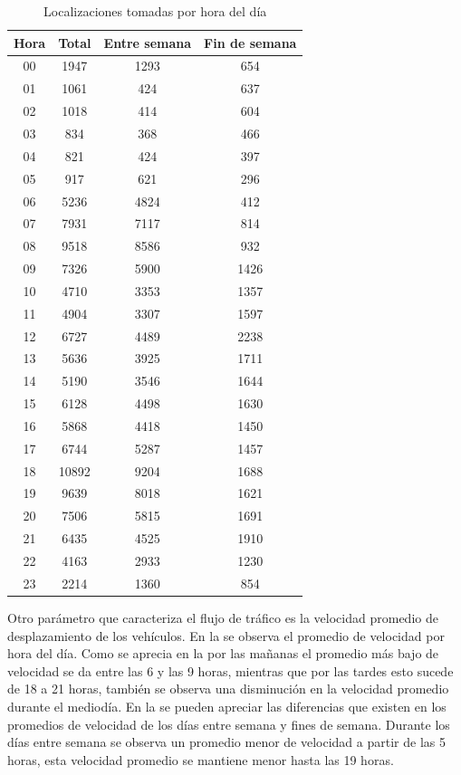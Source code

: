 \begin{table}[!h]
	\centering
	\begin{tabular}{cccc}
        \toprule
    	Hora  & Total & Entre semana & Fin de semana\\
    	\midrule
    	00 & 1947 & 1293 & 654 \\
    	01 & 1061 & 424 & 637 \\
    	02 & 1018 & 414 & 604 \\ 
    	03 & 834 & 368 & 466\\
    	04 & 821 & 424 & 397\\
    	05 & 917 & 621 & 296\\
    	06 & 5236 & 4824 & 412 \\
    	07 & 7931 & 7117 & 814\\
    	08 & 9518 & 8586 & 932\\
    	09 & 7326 & 5900 & 1426\\ 
    	10 & 4710 & 3353 & 1357\\
    	11 & 4904 & 3307 & 1597\\
    	12 & 6727 & 4489 & 2238\\
    	13 & 5636 & 3925 & 1711\\
    	14 & 5190 & 3546 & 1644\\
    	15 & 6128 & 4498 & 1630\\
    	16 & 5868 & 4418 & 1450\\ 
    	17 & 6744 & 5287 & 1457\\
    	18 & 10892 & 9204 & 1688\\
    	19 & 9639 & 8018 & 1621\\
    	20 & 7506 & 5815 & 1691\\
    	21 & 6435 & 4525 & 1910\\
    	22 & 4163 & 2933 & 1230 \\
    	23 & 2214 & 1360 & 854\\
    	\bottomrule
	\end{tabular}
	\caption{Localizaciones tomadas por hora del día} 
	\label{table:localizaciones_por_hora}
\end{table}

Otro parámetro que caracteriza el flujo de tráfico es la velocidad promedio de desplazamiento de los vehículos. En la  se observa el promedio de velocidad por hora del día. Como se aprecia en la  por las mañanas el promedio más bajo de velocidad se da entre las 6 y las 9 horas, mientras que por las tardes esto sucede de 18 a 21 horas, también se observa una disminución en la velocidad promedio durante el mediodía. En la  se pueden apreciar las diferencias que existen en los promedios de velocidad de los días entre semana y fines de semana. Durante los días entre semana se observa un promedio menor de velocidad a partir de las 5 horas, esta velocidad promedio se mantiene menor hasta las 19 horas.

